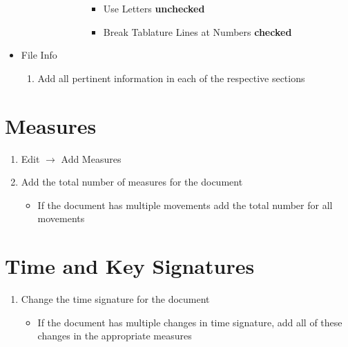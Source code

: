 \documentclass[unicode,hyperfootnotes=false,xetex,colorlinks=true,nofonts,nobib]{tufte-handout} %
\begin{document}
\begin{itemize}
\begin{enumerate}
\begin{enumerate}
\begin{enumerate}
\begin{enumerate}
\begin{itemize}
          \item Use Letters \textbf{unchecked}
          \item Break Tablature Lines at Numbers \textbf{checked}
          \end{itemize}
        \end{enumerate}
      \end{enumerate}
    \end{enumerate}
  \end{enumerate}
\item File Info
  \begin{enumerate}
  \item Add all pertinent information in each of the respective sections 
  \end{enumerate}
\end{itemize}

\section{Measures}
\label{sec:measures}

\begin{enumerate}
\item Edit $\rightarrow$ Add Measures
\item Add the total number of measures for the document
  \begin{itemize}
  \item If the document has multiple movements add the total number for all movements
  \end{itemize}
\end{enumerate}

\section{Time and Key Signatures}
\label{sec:time-key-signatures}

\begin{enumerate}
\item Change the time signature for the document
  \begin{itemize}
  \item If the document has multiple changes in time signature, add all of these changes in the appropriate measures
  \end{itemize}
\end{enumerate}
\end{document}
